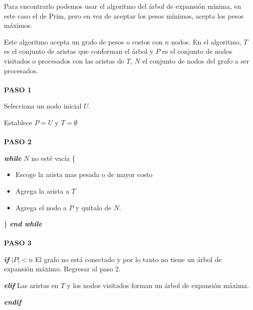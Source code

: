 \documentclass{article}
\begin{document}
Para encontrarlo podemos usar el algoritmo del árbol de expansión mínima, en
este caso el de Prim, pero en vez de aceptar los pesos mínimos, acepta los pesos
máximos.

Este algoritmo acepta un grafo de pesos o costos con $n$ nodos. En el algoritmo,
$T$ es el conjunto de aristas que conforman el árbol y $P$ es el conjunto de
nodos visitados o procesados con las aristas de $T$, $N$ el conjunto de nodos
del grafo a ser procesados. \\
\\
\textbf{PASO 1}

Selecciona un nodo inicial $U$.

Establece $ P={U} $ y $T=\emptyset$\\
\\
\textbf{PASO 2}

\textbf{\textit{while }} $N$ no esté vacía \{
    \begin{itemize}
        \item Escoge la arista mas pesada o de mayor costo
        \item Agrega la arista a $T$
        \item Agrega el nodo a $P$ y quítalo de $N$.
    \end{itemize}
    \}
\textbf{\textit{end while }}\\
\\
\textbf{PASO 3}

\textbf{\textit{if }} $|P| < n$
El grafo no está conectado y por lo tanto no tiene un árbol de expansión máximo.
Regresar al paso 2.
    
\textbf{\textit{elif }}
Las aristas en $T$ y los nodos visitados forman un árbol de expansión máxima.

\textbf{\textit{endif }}
\end{document}
